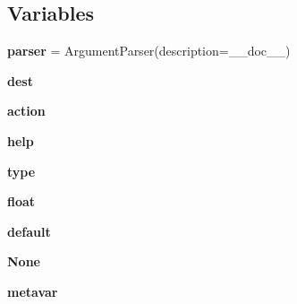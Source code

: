 \subsection*{Variables}
\begin{DoxyCompactItemize}
\item 
\mbox{\label{namespacepymavlink_1_1tools_1_1magfit__gps_ab6b7e52bfb62d8f23156f6943dc01d1a}} 
{\bfseries parser} = Argument\+Parser(description=\+\_\+\+\_\+doc\+\_\+\+\_\+)
\item 
\mbox{\label{namespacepymavlink_1_1tools_1_1magfit__gps_ae10944b78f7d03cb1c78a5e9763c979a}} 
{\bfseries dest}
\item 
\mbox{\label{namespacepymavlink_1_1tools_1_1magfit__gps_a005f587c63c9518cc0aca1f07fcc196b}} 
{\bfseries action}
\item 
\mbox{\label{namespacepymavlink_1_1tools_1_1magfit__gps_a3f6fa40120289dfb120c9396b80195e0}} 
{\bfseries help}
\item 
\mbox{\label{namespacepymavlink_1_1tools_1_1magfit__gps_a004b6dfbf5290a554bfda553dbe01f6e}} 
{\bfseries type}
\item 
\mbox{\label{namespacepymavlink_1_1tools_1_1magfit__gps_ad7c096438beeb93459cb78fc9c7838e4}} 
{\bfseries float}
\item 
\mbox{\label{namespacepymavlink_1_1tools_1_1magfit__gps_a7ba8896c4a99fae0ebc7ebdb05960e7a}} 
{\bfseries default}
\item 
\mbox{\label{namespacepymavlink_1_1tools_1_1magfit__gps_a7cc8f3ed5e508a097ae250f70d8cf307}} 
{\bfseries None}
\item 
\mbox{\label{namespacepymavlink_1_1tools_1_1magfit__gps_aa36b0fa265b0a1c2c16bbecd441f4bbe}} 
{\bfseries metavar}
\item 
\mbox{\label{namespacepymavlink_1_1tools_1_1magfit__gps_ad3c8ecbb43e70d3144407b8b4603376c}} 

\end{DoxyCompactItemize}
